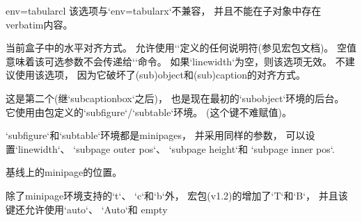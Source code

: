 \begin{tableobject}{env=tabular}{cl}
  该选项与`env=tabularx`不兼容，
  并且不能在子对象中存在verbatim内容。

  当前盒子中的水平对齐方式。
  允许使用`\DeclareCaptionJustification`定义的任何说明符(参见宏包文档)。
  空值意味着该可选参数不会传递给`\subcaptionbox`命令。
  如果`linewidth`为空，则该选项无效。
  不建议使用该选项，
  因为它破坏了(sub)object和(sub)caption的对齐方式。

\bigpar

  这是第二个(继`subcaptionbox`之后)，
  也是现在最初的`subobject`环境的后台。
  它使用由包定义的`subfigure`\slash `subtable`环境。
  (这个键不难赋值)。

  `subfigure`和`subtable`环境都是minipages，
  并采用同样的参数，
  可以设置`linewidth`、 `subpage outer pos`、
  `subpage height`和 `subpage inner pos`.

  基线上的minipage的位置。

  除了minipage环境支持的`t`、 `c`和`b`外，
  宏包(v1.2)的增加了`T`和`B`，
  并且该键还允许使用`auto`、 `Auto`和 empty


\end{tableobject}
